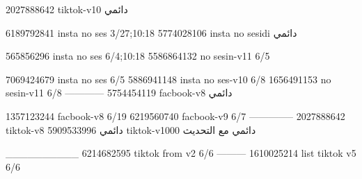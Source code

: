 2027888642 tiktok-v10
دائمي

6189792841 insta no ses
3/27;10:18
5774028106 insta no sesidi
دائمي

565856296 insta no ses
6/4;10:18
5586864132 no sesin-v11
6/5

7069424679 insta no ses
6/5
5886941148 insta no ses-v10
6/8
1656491153 no sesin-v11
6/8
------------
5754454119 facbook-v8
دائمي

1357123244 facbook-v8
6/19
6219560740 facbook-v9
6/7
--------------
2027888642 tiktok-v8
دائمي
5909533996 tiktok-v1000
دائمي مع التحديث

__________
6214682595 tiktok from v2
6/6
---------
1610025214 list tiktok v5
6/6
